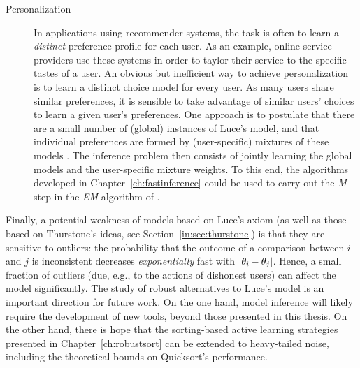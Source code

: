 \begin{description}
\item[Personalization] In applications using recommender systems, the task is often to learn a \emph{distinct} preference profile for each user.
As an example, online service providers use these systems in order to taylor their service to the specific tastes of a user.
An obvious but inefficient way to achieve personalization is to learn a distinct choice model for every user.
As many users share similar preferences, it is sensible to take advantage of similar users' choices to learn a given user's preferences.
One approach is to postulate that there are a small number of (global) instances of Luce's model, and that individual preferences are formed by (user-specific) mixtures of these models \citep{gormley2008exploring, ammar2015ranked}.
The inference problem then consists of jointly learning the global models and the user-specific mixture weights.
To this end, the algorithms developed in Chapter~\ref{ch:fastinference} could be used to carry out the \emph{M} step in the \emph{EM} algorithm of \citet{gormley2008exploring}.
\end{description}

Finally, a potential weakness of models based on Luce's axiom (as well as those based on Thurstone's ideas, see Section~\ref{in:sec:thurstone}) is that they are sensitive to outliers: the probability that the outcome of a comparison between $i$ and $j$ is inconsistent decreases \emph{exponentially} fast with $\lvert\theta_i - \theta_j\rvert$.
Hence, a small fraction of outliers (due, e.g., to the actions of dishonest users) can affect the model significantly.
The study of robust alternatives to Luce's model is an important direction for future work.
On the one hand, model inference will likely require the development of new tools, beyond those presented in this thesis.
On the other hand, there is hope that the sorting-based active learning strategies presented in Chapter~\ref{ch:robustsort} can be extended to heavy-tailed noise, including the theoretical bounds on Quicksort's performance.
